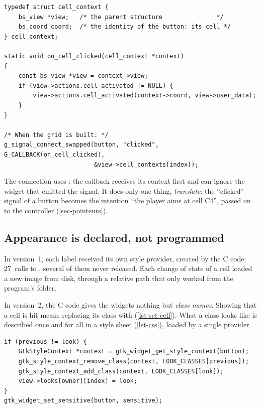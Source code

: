 \begin{lstlisting}[caption={Context of a cell button (\fichier{src/ui/view.c}).},
                   label={lst-contexte}]
typedef struct cell_context {
    bs_view *view;   /* the parent structure               */
    bs_coord coord;  /* the identity of the button: its cell */
} cell_context;

static void on_cell_clicked(cell_context *context)
{
    const bs_view *view = context->view;
    if (view->actions.cell_activated != NULL) {
        view->actions.cell_activated(context->coord, view->user_data);
    }
}

/* When the grid is built: */
g_signal_connect_swapped(button, "clicked", G_CALLBACK(on_cell_clicked),
                         &view->cell_contexts[index]);
\end{lstlisting}

The connection uses : the callback receives its context
first and can ignore the widget that emitted the signal. It does only one thing,
\emph{translate}: the \enquote{clicked} signal of a button becomes the intention
\enquote{the player aims at cell C4}, passed on to the controller (\cref{sec-pointeurs}).

\subsection{Appearance is declared, not programmed}

\begin{attention}
    In version~1, each label received its own style provider, created by the C code: 27~calls
    to , several of them never released. Each change of state of
    a cell loaded a new image from disk, through a relative path that only worked from the
    program's folder.
\end{attention}

In version~2, the C code gives the widgets nothing but \emph{class names}. Showing that a
cell is hit means replacing its class  with  (\cref{lst-set-cell}).
What a class looks like is described once and for all in a style sheet (\cref{lst-css}),
loaded by a single provider.

\begin{lstlisting}[caption={Updating a cell: a mere change of class.},
                   label={lst-set-cell}]
if (previous != look) {
    GtkStyleContext *context = gtk_widget_get_style_context(button);
    gtk_style_context_remove_class(context, LOOK_CLASSES[previous]);
    gtk_style_context_add_class(context, LOOK_CLASSES[look]);
    view->looks[owner][index] = look;
}
gtk_widget_set_sensitive(button, sensitive);
\end{lstlisting}

